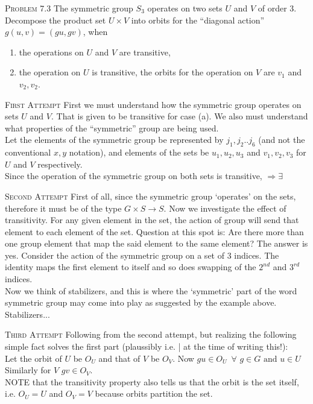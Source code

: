 \documentclass[12pt]{article}
\begin{document}
\textsc {Problem 7.3  }  The symmetric group $S_{3}$ operates on two sets $U$ and $V$ of order 3. Decompose the product set $U\times V$ into orbits for the ``diagonal action'' $g(u,v)=(gu,gv)$, when
\begin{enumerate} [{\bf (a)}]
\item the operations on $U$ and $V$ are transitive,
\item the operation on $U$ is transitive, the orbits for the operation on $V$ are ${v_{1}}$ and ${v_{2},v_{2}}$.
\end{enumerate}
\textsc {First Attempt } First we must understand how the symmetric group operates on sets $U$ and $V$. That is given to be transitive for case (a). We also must understand what properties of the ``symmetric'' group are being used.\\
Let the elements of the symmetric group be represented by $j_{1},j_{2}..j_{6}$ (and not the conventional $x,y$ notation), and elements of the sets be $u_{1},u_{2},u_{3}$ and $v_{1},v_{2},v_{3}$ for $U$ and $V$ respectively.\\
Since the operation of the symmetric group on both sets is transitive, $\Rightarrow \exists$
\par
\textsc {Second Attempt } First of all, since the symmetric group `operates' on the sets, therefore it must be of the type $G\times S \rightarrow S$. Now we investigate the effect of transitivity. For any given element in the set, the action of group will send that element to each element of the set. Question at this spot is: Are there more than one group element that map the said element to the same element? The answer is yes. Consider the action of the symmetric group on a set of 3 indices. The identity maps the first element to itself and so does swapping of the $2^{nd}$ and $3^{rd}$ indices.\\
Now we think of stabilizers, and this is where the `symmetric' part of the word symmetric group may come into play as suggested by the example above. Stabilizers...
\par
\textsc {Third Attempt } Following from the second attempt, but realizing the following simple fact solves the first part (plaussibly i.e. | at the time of writing this!):\\
Let the orbit of $U$ be $O_{U}$ and that of $V$ be $O_{V}$. Now $gu \in O_{U} \,\,\, \forall \,\, g \in G \text{  and  } u \in U$\\
Similarly for $V$ $gv \in O_{V}$.\\NOTE that the transitivity property also tells us that the orbit is the set itself, i.e. $O_{U}=U$ and $O_{V}=V$ because orbits partition the set.\\
\end{document}
